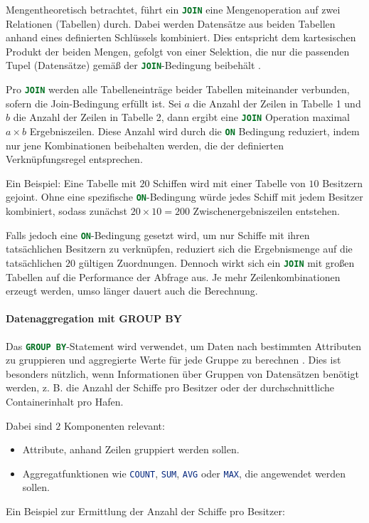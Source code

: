 Mengentheoretisch betrachtet, führt ein \lstinline[language=SQL]|JOIN|
eine Mengenoperation auf zwei Relationen (Tabellen) durch. Dabei werden Datensätze aus beiden Tabellen anhand eines definierten Schlüssels kombiniert. Dies entspricht dem kartesischen Produkt der beiden Mengen, gefolgt von einer Selektion, die nur die passenden Tupel (Datensätze) gemäß der \lstinline[language=SQL]|JOIN|-Bedingung beibehält \cite{Elmasri2015}.

Pro \lstinline[language=SQL]|JOIN| werden alle Tabelleneinträge beider Tabellen miteinander verbunden, sofern die Join-Bedingung erfüllt ist.  
Sei \( a \) die Anzahl der Zeilen in Tabelle 1 und \( b \) die Anzahl der Zeilen in Tabelle 2, dann ergibt eine \lstinline[language=SQL]|JOIN| Operation maximal \( a \times b \) Ergebniszeilen.  
Diese Anzahl wird durch die \lstinline[language=SQL]|ON| Bedingung reduziert, indem nur jene Kombinationen beibehalten werden, die der definierten Verknüpfungsregel entsprechen.

Ein Beispiel: Eine Tabelle mit $20$ Schiffen wird mit einer Tabelle von $10$ Besitzern gejoint.  
Ohne eine spezifische \lstinline[language=SQL]|ON|-Bedingung würde jedes Schiff mit jedem Besitzer kombiniert, sodass zunächst $20 \times 10 = 200$ Zwischenergebniszeilen entstehen.  

Falls jedoch eine \lstinline[language=SQL]|ON|-Bedingung gesetzt wird, um nur Schiffe mit ihren tatsächlichen Besitzern zu verknüpfen, reduziert sich die Ergebnismenge auf die tatsächlichen $20$ gültigen Zuordnungen.  
Dennoch wirkt sich ein \lstinline[language=SQL]|JOIN| mit großen Tabellen auf die Performance der Abfrage aus. Je mehr Zeilenkombinationen erzeugt werden, umso länger dauert auch die Berechnung.
\paragraph{Datenaggregation mit GROUP BY}

Das \lstinline[language=SQL]|GROUP BY|-Statement wird verwendet, um Daten nach bestimmten Attributen zu gruppieren und aggregierte Werte für jede Gruppe zu berechnen \cite{Elmasri2015}. 
Dies ist besonders nützlich, wenn Informationen über Gruppen von Datensätzen benötigt werden, z. B. die Anzahl der Schiffe pro Besitzer oder der durchschnittliche Containerinhalt pro Hafen.

Dabei sind $2$ Komponenten relevant:
\begin{itemize}[noitemsep]
    \item Attribute, anhand Zeilen gruppiert werden sollen.
    \item Aggregatfunktionen wie \lstinline[language=SQL]|COUNT|, 
    \lstinline[language=SQL]|SUM|, 
    \lstinline[language=SQL]|AVG| 
    oder \lstinline[language=SQL]|MAX|, die angewendet werden sollen.
\end{itemize}
Ein Beispiel zur Ermittlung der Anzahl der Schiffe pro Besitzer:

